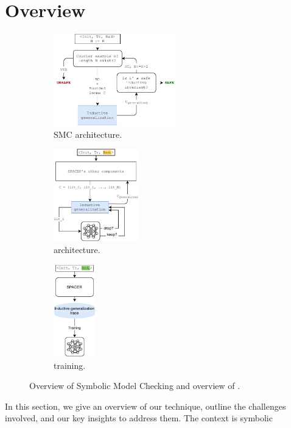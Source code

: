 \section{Overview}
\label{sec:overview}
\begin{figure}[t]
  \centering
  \begin{subfigure}[b]{0.4\textwidth}
  \centering
    \includegraphics[height=4cm]{figures/doping-spacer}
    \caption{SMC architecture.}
    \label{fig:smc}
  \end{subfigure}
  \begin{subfigure}[b]{0.31\textwidth}
    \centering
    \includegraphics[height=4cm]{figures/doping-Page-general_architecture.pdf}
    \caption{\dpy architecture.}
    \label{fig:dopey}
	\end{subfigure}
  \begin{subfigure}[b]{0.15\textwidth}
  \centering
    \includegraphics[height=4cm]{figures/doping-training.pdf}
    \caption{\dpy training.}
    \label{fig:spc_train}
	\end{subfigure}
	\caption{Overview of Symbolic Model Checking and overview of \dpy.}
  \label{fig:overview}
\end{figure}
In this section, we give an overview of our technique, outline the challenges
involved, and our key insights to address them. The context is symbolic
